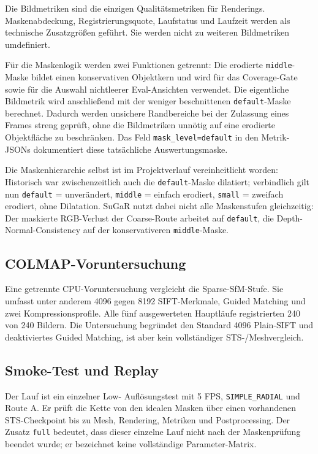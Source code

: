 Die Bildmetriken sind die einzigen Qualitätsmetriken für Renderings.
Maskenabdeckung, Registrierungsquote, Laufstatus und Laufzeit werden als
technische Zusatzgrößen geführt. Sie werden nicht zu weiteren Bildmetriken
umdefiniert.

Für die Maskenlogik werden zwei Funktionen getrennt: Die erodierte
\texttt{middle}-Maske bildet einen konservativen Objektkern und wird für das
Coverage-Gate sowie für die Auswahl nichtleerer Eval-Ansichten verwendet. Die
eigentliche Bildmetrik wird anschließend mit der weniger beschnittenen
\texttt{default}-Maske berechnet. Dadurch werden unsichere Randbereiche bei
der Zulassung eines Frames streng geprüft, ohne die Bildmetriken unnötig auf
eine erodierte Objektfläche zu beschränken. Das Feld
\texttt{mask\_level=default} in den Metrik-JSONs dokumentiert diese tatsächliche
Auswertungsmaske.

Die Maskenhierarchie selbst ist im Projektverlauf vereinheitlicht worden:
Historisch war zwischenzeitlich auch die \texttt{default}-Maske dilatiert;
verbindlich gilt nun \texttt{default} = unverändert, \texttt{middle} = einfach
erodiert, \texttt{small} = zweifach erodiert, ohne Dilatation. SuGaR nutzt
dabei nicht alle Maskenstufen gleichzeitig: Der maskierte RGB-Verlust der
Coarse-Route arbeitet auf \texttt{default}, die Depth-Normal-Consistency auf
der konservativeren \texttt{middle}-Maske.

\subsection{COLMAP-Voruntersuchung}

Eine getrennte CPU-Voruntersuchung vergleicht die Sparse-SfM-Stufe. Sie umfasst
unter anderem 4096 gegen 8192 SIFT-Merkmale, Guided Matching und zwei
Kompressionsprofile. Alle fünf ausgewerteten Hauptläufe registrierten 240 von
240 Bildern. Die Untersuchung begründet den Standard 4096 Plain-SIFT und
deaktiviertes Guided Matching, ist aber kein vollständiger STS-/Meshvergleich.

\subsection{Smoke-Test und Replay}

Der Lauf  ist ein einzelner Low-
Auflösungstest mit 5 FPS, \texttt{SIMPLE\_RADIAL} und Route A. Er prüft die Kette von den
idealen Masken über einen vorhandenen STS-Checkpoint bis zu Mesh, Rendering,
Metriken und Postprocessing. Der Zusatz \texttt{full} bedeutet, dass dieser
einzelne Lauf nicht nach der Maskenprüfung beendet wurde; er bezeichnet keine
vollständige Parameter-Matrix.

